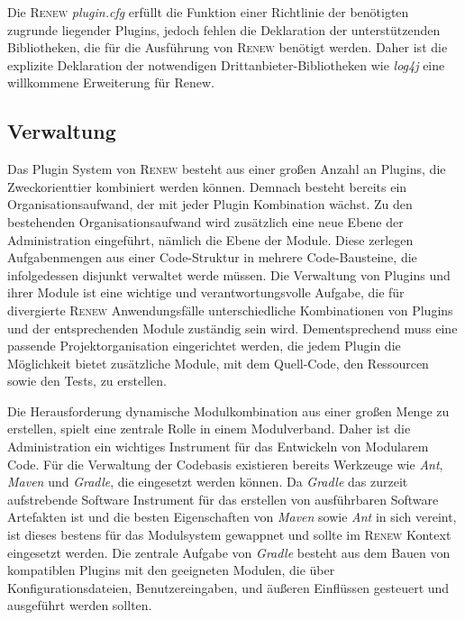 		Die \textsc{Renew} \textit{plugin.cfg} erfüllt die Funktion einer Richtlinie der benötigten zugrunde liegender Plugins, jedoch fehlen die Deklaration der unterstützenden Bibliotheken, die für die Ausführung von \textsc{Renew} benötigt werden. Daher ist die explizite Deklaration der notwendigen Drittanbieter-Bibliotheken wie \textit{log4j} eine willkommene Erweiterung für Renew. 

	\subsection{Verwaltung} \label{sub:verwaltung}
		Das Plugin System von \textsc{Renew} besteht aus einer großen Anzahl an Plugins, die Zweckorienttier kombiniert werden können. Demnach besteht bereits ein Organisationsaufwand, der mit jeder Plugin Kombination wächst. Zu den bestehenden Organisationsaufwand wird zusätzlich eine neue Ebene der Administration eingeführt, nämlich die Ebene der Module. Diese zerlegen Aufgabenmengen aus einer Code-Struktur in mehrere Code-Bausteine, die infolgedessen disjunkt verwaltet werde müssen.\newline
		Die Verwaltung von Plugins und ihrer Module ist eine wichtige und verantwortungsvolle Aufgabe, die für divergierte \textsc{Renew} Anwendungsfälle unterschiedliche Kombinationen von Plugins und der entsprechenden Module zuständig sein wird.\newline
		Dementsprechend muss eine passende Projektorganisation eingerichtet werden, die jedem Plugin die Möglichkeit bietet zusätzliche Module, mit dem Quell-Code, den Ressourcen sowie den Tests, zu erstellen.\bigbreak

		Die Herausforderung dynamische Modulkombination aus einer großen Menge zu erstellen, spielt eine zentrale Rolle in einem Modulverband. Daher ist die Administration ein wichtiges Instrument für das Entwickeln von Modularem Code.\newline
		Für die Verwaltung der Codebasis existieren bereits Werkzeuge wie \textit{Ant}, \textit{Maven} und \textit{Gradle}, die eingesetzt werden können. Da \textit{Gradle} das zurzeit aufstrebende Software Instrument für das erstellen von ausführbaren Software Artefakten ist und die besten Eigenschaften von \textit{Maven} sowie \textit{Ant} in sich vereint, ist dieses bestens für das Modulsystem gewappnet und sollte im \textsc{Renew} Kontext eingesetzt werden. \bigbreak
	    Die zentrale Aufgabe von \textit{Gradle} besteht aus dem Bauen von kompatiblen Plugins mit den geeigneten Modulen, die über Konfigurationsdateien, Benutzereingaben, und äußeren Einflüssen gesteuert und ausgeführt werden sollten.

